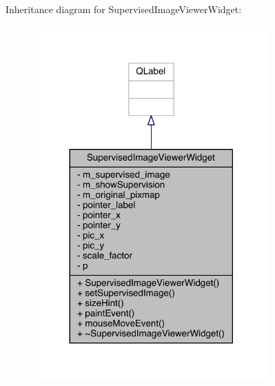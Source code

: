 Inheritance diagram for Supervised\+Image\+Viewer\+Widget\+:\nopagebreak
\begin{figure}[H]
\begin{center}
\leavevmode
\includegraphics[width=257pt]{class_supervised_image_viewer_widget__inherit__graph}
\end{center}
\end{figure}



